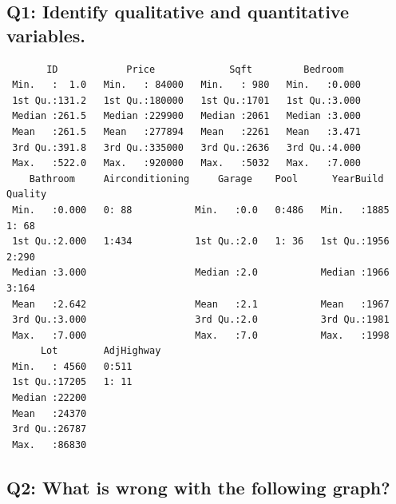 \documentclass[]{article}
\begin{document}
\newpage

\hypertarget{q1-identify-qualitative-and-quantitative-variables.}{%
\subsection{Q1: Identify qualitative and quantitative
variables.}\label{q1-identify-qualitative-and-quantitative-variables.}}

\begin{verbatim}
       ID            Price             Sqft         Bedroom     
 Min.   :  1.0   Min.   : 84000   Min.   : 980   Min.   :0.000  
 1st Qu.:131.2   1st Qu.:180000   1st Qu.:1701   1st Qu.:3.000  
 Median :261.5   Median :229900   Median :2061   Median :3.000  
 Mean   :261.5   Mean   :277894   Mean   :2261   Mean   :3.471  
 3rd Qu.:391.8   3rd Qu.:335000   3rd Qu.:2636   3rd Qu.:4.000  
 Max.   :522.0   Max.   :920000   Max.   :5032   Max.   :7.000  
    Bathroom     Airconditioning     Garage    Pool      YearBuild    Quality
 Min.   :0.000   0: 88           Min.   :0.0   0:486   Min.   :1885   1: 68  
 1st Qu.:2.000   1:434           1st Qu.:2.0   1: 36   1st Qu.:1956   2:290  
 Median :3.000                   Median :2.0           Median :1966   3:164  
 Mean   :2.642                   Mean   :2.1           Mean   :1967          
 3rd Qu.:3.000                   3rd Qu.:2.0           3rd Qu.:1981          
 Max.   :7.000                   Max.   :7.0           Max.   :1998          
      Lot        AdjHighway
 Min.   : 4560   0:511     
 1st Qu.:17205   1: 11     
 Median :22200             
 Mean   :24370             
 3rd Qu.:26787             
 Max.   :86830             
\end{verbatim}

\newpage

\hypertarget{q2-what-is-wrong-with-the-following-graph}{%
\subsection{Q2: What is wrong with the following
graph?}\label{q2-what-is-wrong-with-the-following-graph}}
\end{document}
